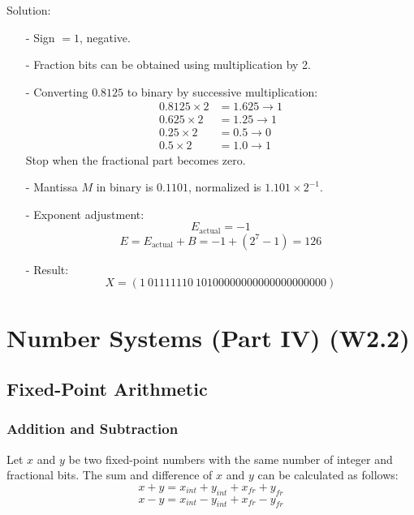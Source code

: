 \documentclass[12pt,openany]{book}
\begin{document}
			      	Solution:
			      	\begin{itemize}
			      		\item[-] Sign \( = 1 \), negative.
			      		\item[-] Fraction bits can be obtained using multiplication by 2.
			      		\item[-] Converting \( 0.8125 \) to binary by successive multiplication:
			      		      \begin{align*}
			      		      	0.8125 \times 2 & = 1.625 \rightarrow 1 \\
			      		      	0.625 \times 2  & = 1.25 \rightarrow 1  \\
			      		      	0.25 \times 2   & = 0.5 \rightarrow 0   \\
			      		      	0.5 \times 2    & = 1.0 \rightarrow 1   
			      		      \end{align*}
			      		      Stop when the fractional part becomes zero.
			      		\item[-] Mantissa \( M \) in binary is \( 0.1101 \), normalized is \( 1.101 \times 2^{-1} \).
			      		\item[-] Exponent adjustment:
			      		      \[ E_{\text{actual}} = -1 \]
			      		      \[ E = E_{\text{actual}} + B = -1 + (2^7 - 1) = 126 \]
			      		\item[-] Result:
			      		      \[ X = (1\ 01111110\ 10100000000000000000000) \]
			      	\end{itemize}
			      	
			      	
			      	\chapter{Number Systems (Part IV) (W2.2)}
			      	\section{Fixed-Point Arithmetic}
			      	\subsection{Addition and Subtraction}
			      	
			      	Let \( x \) and \( y \) be two fixed-point numbers with the same number of integer and fractional bits. The sum and difference of \( x \) and \( y \) can be calculated as follows:
			      	$$x + y = x_{int} + y_{int} + x_{fr} + y_{fr}$$ 
			      	$$x - y = x_{int} - y_{int} + x_{fr} - y_{fr}$$
			      	 
\end{document}
